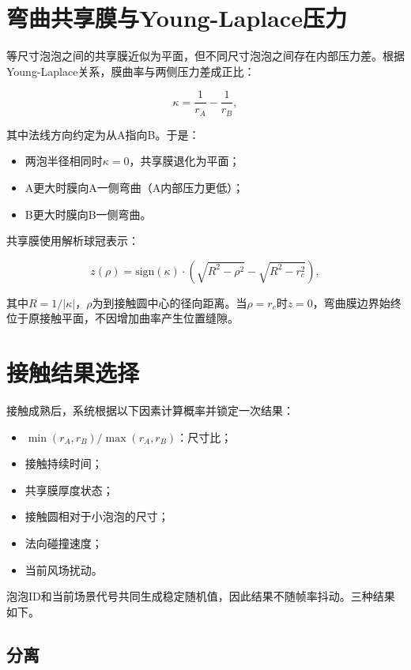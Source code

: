 \section{弯曲共享膜与Young-Laplace压力}

等尺寸泡泡之间的共享膜近似为平面，但不同尺寸泡泡之间存在内部压力差。根据Young-Laplace关系，膜曲率与两侧压力差成正比：

\[
\kappa = \frac{1}{r_A} - \frac{1}{r_B},
\]

其中法线方向约定为从A指向B。于是：
\begin{itemize}
  \item 两泡半径相同时$\kappa=0$，共享膜退化为平面；
  \item A更大时膜向A一侧弯曲（A内部压力更低）；
  \item B更大时膜向B一侧弯曲。
\end{itemize}

共享膜使用解析球冠表示：

\[
z(\rho) = \mathrm{sign}(\kappa) \cdot
\left(\sqrt{R^2 - \rho^2} - \sqrt{R^2 - r_c^2}\right),
\]

其中$R = 1/|\kappa|$，$\rho$为到接触圆中心的径向距离。当$\rho = r_c$时$z=0$，弯曲膜边界始终位于原接触平面，不因增加曲率产生位置缝隙。


\section{接触结果选择}

接触成熟后，系统根据以下因素计算概率并锁定一次结果：

\begin{itemize}
  \item $\min(r_A, r_B) / \max(r_A, r_B)$：尺寸比；
  \item 接触持续时间；
  \item 共享膜厚度状态；
  \item 接触圆相对于小泡泡的尺寸；
  \item 法向碰撞速度；
  \item 当前风场扰动。
\end{itemize}

泡泡ID和当前场景代号共同生成稳定随机值，因此结果不随帧率抖动。三种结果如下。

\subsection{分离}

